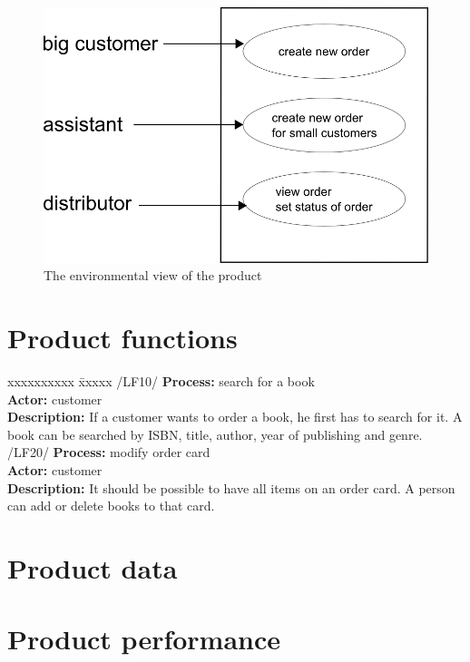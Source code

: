 \documentclass[11pt,a4paper,oneside,svgnames]{report}
\begin{document}
\begin{figure}[h!]
 \begin{center}
  \includegraphics[scale=0.8]{images/umweltdiagramm.png}
 \end{center}
 \caption{The environmental view of the product}
\end{figure}


\chapter{Product functions}
\begin{tabbing}
    xxxxxxxxxx \= xxxxx \kill
    /LF10/ \> \textbf{Process:} search for a book\\
	\> \textbf{Actor:} customer\\ 
	\>\textbf{Description:} If a customer wants to order a book, he first has to search for it. A book can be searched by ISBN, title, author, year of publishing and genre.\\
	
	/LF20/ \> \textbf{Process:} modify order card\\
	\> \textbf{Actor:} customer\\ 
	\>\textbf{Description:} It should be possible to have all items on an order card. A person can add or delete books to that card.\\
\end{tabbing}

\chapter{Product data}
\chapter{Product performance}
\end{document}
